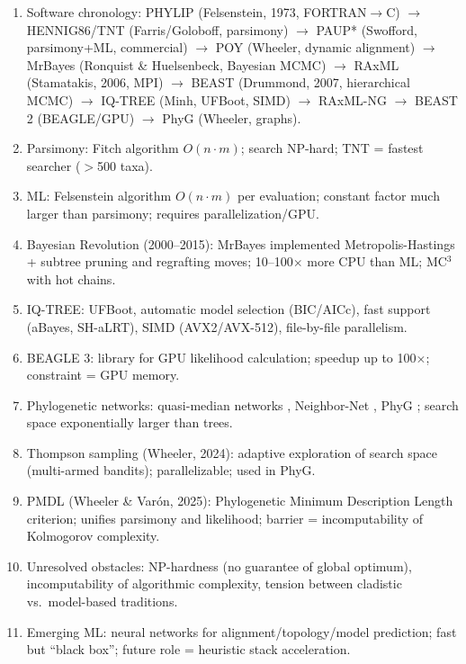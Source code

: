 \clearpage
\begin{revise}\small
\begin{enumerate}[itemsep=0pt, topsep=0pt, parsep=0pt]
    \item Software chronology: PHYLIP (Felsenstein, 1973, FORTRAN$\to$C) $\to$ HENNIG86/TNT (Farris/Goloboff, parsimony) $\to$ PAUP* (Swofford, parsimony+ML, commercial) $\to$ POY (Wheeler, dynamic alignment) $\to$ MrBayes (Ronquist \& Huelsenbeck, Bayesian MCMC) $\to$ RAxML (Stamatakis, 2006, MPI) $\to$ BEAST (Drummond, 2007, hierarchical MCMC) $\to$ IQ-TREE (Minh, UFBoot, SIMD) $\to$ RAxML-NG $\to$ BEAST 2 (BEAGLE/GPU) $\to$ PhyG (Wheeler, graphs).
    \item Parsimony: Fitch algorithm $O(n\cdot m)$; search NP-hard; TNT = fastest searcher ($>$500 taxa).
    \item ML: Felsenstein algorithm $O(n\cdot m)$ per evaluation; constant factor much larger than parsimony; requires parallelization/GPU.
    \item Bayesian Revolution (2000--2015): MrBayes implemented Metropolis-Hastings + subtree pruning and regrafting moves; 10--100$\times$ more CPU than ML; MC$^3$ with hot chains.
    \item IQ-TREE: UFBoot, automatic model selection (BIC/AICc), fast support (aBayes, SH-aLRT), SIMD (AVX2/AVX-512), file-by-file parallelism.
    \item BEAGLE 3: library for GPU likelihood calculation; speedup up to 100$\times$; constraint = GPU memory.
    \item Phylogenetic networks: quasi-median networks \parencite{holland2004}, Neighbor-Net \parencite{bryant2004}, PhyG \parencite{wheeler2024a}; search space exponentially larger than trees.
    \item Thompson sampling (Wheeler, 2024): adaptive exploration of search space (multi-armed bandits); parallelizable; used in PhyG.
    \item PMDL (Wheeler \& Varón, 2025): Phylogenetic Minimum Description Length criterion; unifies parsimony and likelihood; barrier = incomputability of Kolmogorov complexity.
    \item Unresolved obstacles: NP-hardness (no guarantee of global optimum), incomputability of algorithmic complexity, tension between cladistic vs.\ model-based traditions.
    \item Emerging ML: neural networks for alignment/topology/model prediction; fast but ``black box''; future role = heuristic stack acceleration.
\end{enumerate}
\end{revise}

\clearpage

\printbibliography[heading=subbibliography,title={References}]

